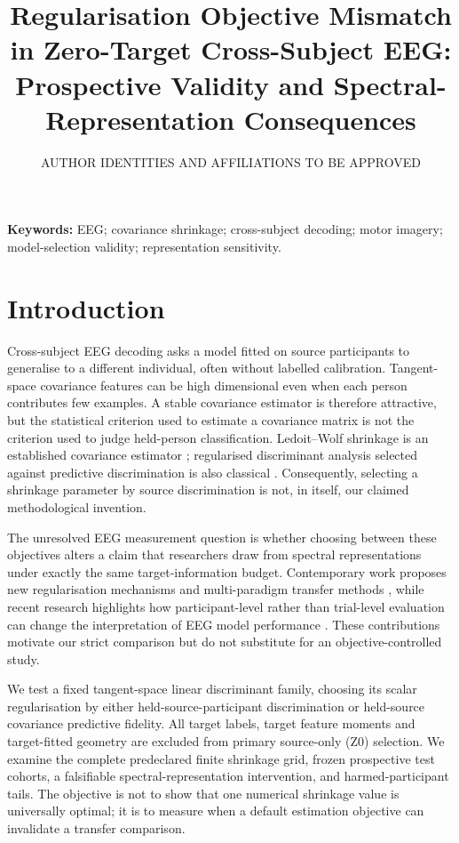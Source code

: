 \documentclass[11pt,a4paper]{article}
\title{Regularisation Objective Mismatch in Zero-Target Cross-Subject EEG:\\
Prospective Validity and Spectral-Representation Consequences}
\author{AUTHOR IDENTITIES AND AFFILIATIONS TO BE APPROVED}
\date{}
\begin{document}
\maketitle

\noindent\textbf{Keywords:} EEG; covariance shrinkage; cross-subject decoding;
motor imagery; model-selection validity; representation sensitivity.

\section{Introduction}
Cross-subject EEG decoding asks a model fitted on source participants to
generalise to a different individual, often without labelled calibration.
Tangent-space covariance features can be high dimensional even when each
person contributes few examples. A stable covariance estimator is therefore
attractive, but the statistical criterion used to estimate a covariance
matrix is not the criterion used to judge held-person classification.
Ledoit--Wolf shrinkage is an established covariance estimator
\cite{ledoit2004}; regularised discriminant analysis selected against
predictive discrimination is also classical \cite{friedman1989}.
Consequently, selecting a shrinkage parameter by source discrimination
is not, in itself, our claimed methodological invention.

The unresolved EEG measurement question is whether choosing between these
objectives alters a claim that researchers draw from spectral representations
under exactly the same target-information budget. Contemporary work proposes
new regularisation mechanisms and multi-paradigm transfer methods
\cite{miao2025freezing,morvay2026wbt}, while recent research highlights
how participant-level rather than trial-level evaluation can change the
interpretation of EEG model performance \cite{gil2026subjectvalidation}.
These contributions motivate our strict comparison but do not substitute
for an objective-controlled study.

We test a fixed tangent-space linear discriminant family, choosing its
scalar regularisation by either held-source-participant discrimination or
held-source covariance predictive fidelity. All target labels, target feature
moments and target-fitted geometry are excluded from primary source-only
(Z0) selection. We examine the complete predeclared finite shrinkage grid,
frozen prospective test cohorts, a falsifiable spectral-representation
intervention, and harmed-participant tails. The objective is not to show
that one numerical shrinkage value is universally optimal; it is to measure
when a default estimation objective can invalidate a transfer comparison.
\end{document}
